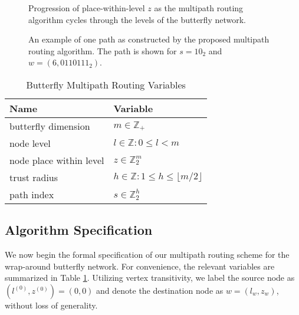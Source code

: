 \documentclass[10pt,letterpaper]{article}
\begin{document}
\begin{figure}[H]
\caption{
Progression of place-within-level $z$ as the multipath routing algorithm
cycles through the levels of the butterfly network.
\label{fig:route-overview}
}
\end{figure}

\begin{figure}[H]
\begin{center}
\end{center}
\caption{
An example of one path as constructed by the proposed multipath
routing algorithm.
The path is shown for $s = 10_2$
and $w = (6, 0110111_2)$.
\label{fig:routing}
}
\end{figure}

\begin{table}[h!]
\caption{Butterfly Multipath Routing Variables\label{tab:routing}}
\begin{center}
\begin{tabular}{ll}
Name & Variable \\\hline
butterfly dimension & $m \in \mathbb{Z}_+$ \\
node level & $l \in \mathbb{Z} : 0 \leq l < m$ \\
node place within level & $z \in \mathbb{Z}_2^m$ \\
trust radius & $h \in \mathbb{Z} : 1 \leq h \leq \lfloor m/2 \rfloor$ \\
path index & $s \in \mathbb{Z}_2^h$ \\
\end{tabular}
\end{center}
\end{table}

\subsection*{Algorithm Specification}

We now begin the formal specification of our multipath routing scheme for the
wrap-around butterfly network.
For convenience, the relevant variables are summarized in Table \ref{tab:routing}.
Utilizing vertex transitivity, we label the source node as
$(l^{(0)}, z^{(0)}) = (0, 0)$ and denote the destination node as $w = (l_w, z_w)$,
without loss of generality.
\end{document}
